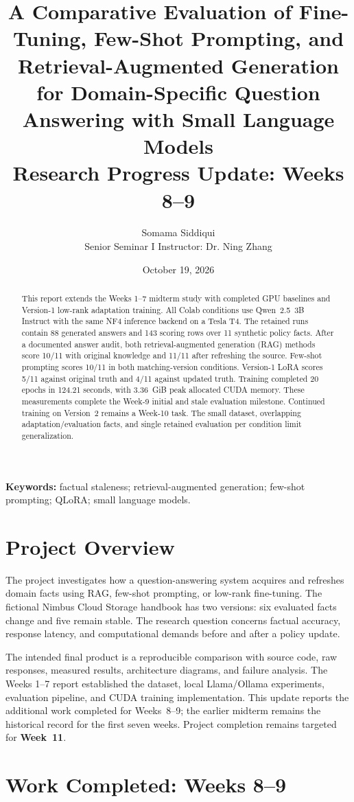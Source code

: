\documentclass[10pt,letterpaper]{article}
\title{\vspace{-1.1em}\textbf{A Comparative Evaluation of Fine-Tuning, Few-Shot Prompting, and Retrieval-Augmented Generation for Domain-Specific Question Answering with Small Language Models}\\[0.4em]\large Research Progress Update: Weeks 8--9}
\author{Somama Siddiqui\\Senior Seminar I \quad Instructor: Dr. Ning Zhang}
\date{October 19, 2026}
\begin{document}
\maketitle
\begin{abstract}
This report extends the Weeks 1--7 midterm study with completed GPU baselines and Version-1 low-rank adaptation training. All Colab conditions use Qwen~2.5~3B Instruct with the same NF4 inference backend on a Tesla T4. The retained runs contain 88 generated answers and 143 scoring rows over 11 synthetic policy facts. After a documented answer audit, both retrieval-augmented generation (RAG) methods score 10/11 with original knowledge and 11/11 after refreshing the source. Few-shot prompting scores 10/11 in both matching-version conditions. Version-1 LoRA scores 5/11 against original truth and 4/11 against updated truth. Training completed 20 epochs in 124.21 seconds, with 3.36~GiB peak allocated CUDA memory. These measurements complete the Week-9 initial and stale evaluation milestone. Continued training on Version~2 remains a Week-10 task. The small dataset, overlapping adaptation/evaluation facts, and single retained evaluation per condition limit generalization.
\end{abstract}
\textbf{Keywords:} factual staleness; retrieval-augmented generation; few-shot prompting; QLoRA; small language models.

\section{Project Overview}
The project investigates how a question-answering system acquires and refreshes domain facts using RAG, few-shot prompting, or low-rank fine-tuning. The fictional Nimbus Cloud Storage handbook has two versions: six evaluated facts change and five remain stable. The research question concerns factual accuracy, response latency, and computational demands before and after a policy update.

The intended final product is a reproducible comparison with source code, raw responses, measured results, architecture diagrams, and failure analysis. The Weeks 1--7 report established the dataset, local Llama/Ollama experiments, evaluation pipeline, and CUDA training implementation. This update reports the additional work completed for Weeks~8--9; the earlier midterm remains the historical record for the first seven weeks. Project completion remains targeted for \textbf{Week~11}.

\clearpage
\section{Work Completed: Weeks 8--9}
\end{document}
